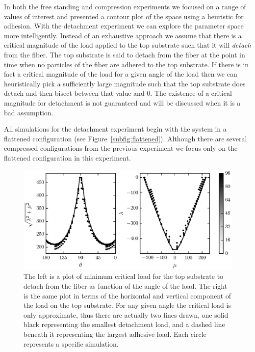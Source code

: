 {In both the free standing and compression experiments we focused on a range of values of interest and presented a contour plot of the space using a heuristic for adhesion. With the detachment experiment we can explore the parameter space more intelligently. Instead of an exhaustive approach we assume that there is a critical magnitude of the load applied to the top substrate such that it will \textit{detach} from the fiber. The top substrate is said to detach from the fiber at the point in time when no particles of the fiber are adhered to the top substrate. If there is in fact a critical magnitude of the load for a given angle of the load then we can heuristically pick a sufficiently large magnitude such that the top substrate does detach and then bisect between that value and $0$. The existence of a critical magnitude for detachment is not guaranteed and will be discussed when it is a bad assumption.

All simulations for the detachment experiment begin with the system in a flattened configuration (see Figure~\ref{subfig:flattened}). Although there are several compressed configurations from the previous experiment we focus only on the flattened configuration in this experiment.
   
   \begin{figure}[t]
      \begin{center}
         \includegraphics{./fig/ch3/pull/ref/grid.eps}
      \end{center}      
      \caption{The left is a plot of minimum critical load for the top substrate to detach from the fiber as function of the angle of the load. The right is the same plot in terms of the horizontal and vertical component of the load on the top substrate. For any given angle the critical load is only approximate, thus there are actually two lines drawn, one solid black representing the smallest detachment load, and a dashed line beneath it representing the largest adhesive load. Each circle represents a specific simulation.
      \label{fig:pull:ref}}
   \end{figure}

}
